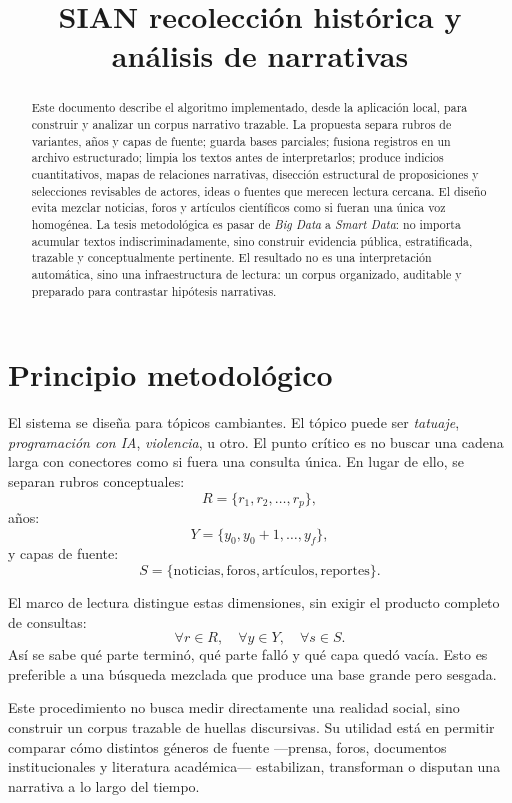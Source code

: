 \documentclass[11pt]{article}
\title{SIAN recolección histórica y análisis de narrativas}
\author{}
\date{}
\begin{document}
\maketitle

\begin{abstract}
Este documento describe el algoritmo implementado, desde la aplicación local,
para construir y analizar un corpus narrativo trazable. La propuesta separa
rubros de variantes, años y capas de fuente; guarda bases parciales; fusiona
registros en un archivo estructurado; limpia los textos antes de interpretarlos;
produce indicios cuantitativos, mapas de relaciones narrativas, disección
estructural de proposiciones y selecciones revisables de actores, ideas o
fuentes que merecen lectura cercana. El diseño evita mezclar noticias, foros y
artículos científicos como si fueran una única voz homogénea. La tesis
metodológica es pasar de \textit{Big Data} a \textit{Smart Data}: no importa
acumular textos indiscriminadamente, sino construir evidencia pública,
estratificada, trazable y conceptualmente pertinente. El resultado no es una
interpretación automática, sino una infraestructura de lectura: un corpus
organizado, auditable y preparado para contrastar hipótesis narrativas.
\end{abstract}

\section{Principio metodológico}

El sistema se diseña para tópicos cambiantes. El tópico puede ser
\textit{tatuaje}, \textit{programación con IA}, \textit{violencia}, u otro. El
punto crítico es no buscar una cadena larga con conectores como si fuera una
consulta única. En lugar de ello, se separan rubros conceptuales:
\[
R=\{r_1,r_2,\ldots,r_p\},
\]
años:
\[
Y=\{y_0,y_0+1,\ldots,y_f\},
\]
y capas de fuente:
\[
S=\{\text{noticias},\text{foros},\text{artículos},\text{reportes}\}.
\]

El marco de lectura distingue estas dimensiones, sin exigir el producto completo de consultas:
\[
\forall r\in R,\quad \forall y\in Y,\quad \forall s\in S.
\]
Así se sabe qué parte terminó, qué parte falló y qué capa quedó vacía. Esto es
preferible a una búsqueda mezclada que produce una base grande pero sesgada.

Este procedimiento no busca medir directamente una realidad social, sino
construir un corpus trazable de huellas discursivas. Su utilidad está en
permitir comparar cómo distintos géneros de fuente ---prensa, foros, documentos
institucionales y literatura académica--- estabilizan, transforman o disputan
una narrativa a lo largo del tiempo.
\end{document}
